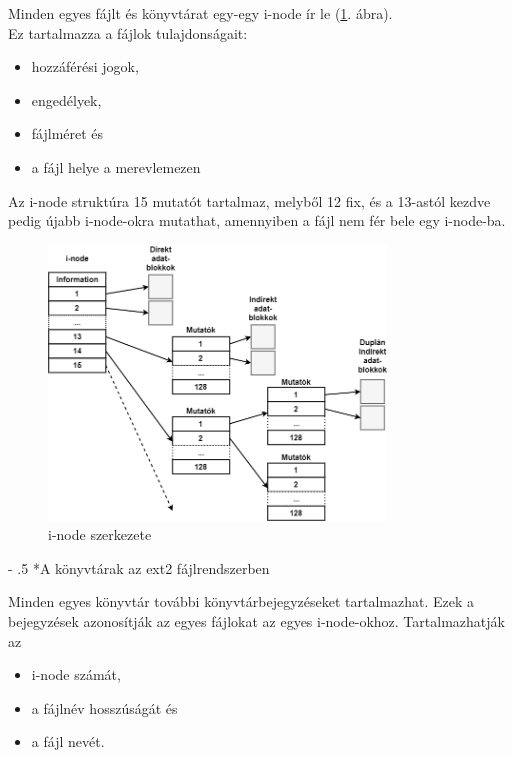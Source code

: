 \documentclass[tikz,12pt,margin=0px]{article}
\makeatletter
\renewcommand\paragraph{%
	\@startsection{paragraph}{4}{0mm}%
	{-\baselineskip}%
	{.5\baselineskip}%
	{\normalfont\normalsize\bfseries}}
\makeatother
\begin{document}
    Minden egyes fájlt és könyvtárat egy-egy i-node ír le (\ref{ref:ex2inode}. ábra).\\
    Ez tartalmazza a fájlok tulajdonságait:
    \begin{itemize}[topsep=8pt,itemsep=4pt,partopsep=4pt, parsep=4pt]
        \item hozzáférési jogok,
        \item engedélyek,
        \item fájlméret és
        \item a fájl helye a merevlemezen
    \end{itemize}

    \noindent Az i-node struktúra 15 mutatót tartalmaz, melyből 12 fix, és a 13-astól kezdve pedig újabb i-node-okra mutathat, amennyiben a fájl nem fér bele egy i-node-ba.

	\begin{figure}[H]
		\centering
		\includegraphics[width=0.8\textwidth]{img/ext2inode.png}
		\caption{i-node szerkezete}
        \label{ref:ex2inode}
	\end{figure}

    \paragraph*{A könyvtárak az ext2 fájlrendszerben}

    Minden egyes könyvtár további könyvtárbejegyzéseket tartalmazhat. Ezek a bejegyzések azonosítják az egyes fájlokat az egyes i-node-okhoz.
    Tartalmazhatják az
    \begin{itemize}[topsep=8pt,itemsep=4pt,partopsep=4pt, parsep=4pt]
        \item i-node számát,
        \item a fájlnév hosszúságát és
        \item a fájl nevét.
    \end{itemize}
\end{document}
